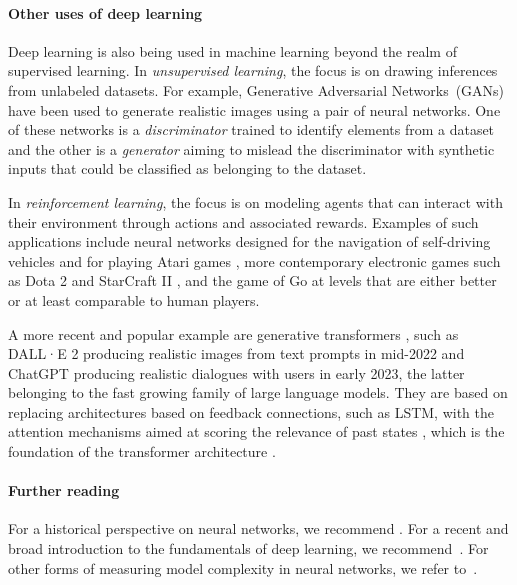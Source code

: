 \paragraph{Other uses of deep learning}
Deep learning is also being used in machine learning beyond the realm of  supervised learning. 
In \emph{unsupervised learning}, the focus is on drawing inferences from unlabeled datasets. 
For example, 
Generative Adversarial Networks~(GANs) \citep{GAN} have been used to generate realistic images using a pair of neural networks. 
One of these networks is a \emph{discriminator} trained to identify elements from a dataset and the other is a \emph{generator} aiming to mislead the discriminator with synthetic inputs that could be classified as belonging to the dataset. 

In \emph{reinforcement learning}, the focus is on modeling agents that can interact with their environment through actions and associated rewards. Examples of such applications include neural networks designed for the navigation of self-driving vehicles \citep{gao2020vectornet} and for playing Atari games \citep{Atari}, more contemporary electronic games such as Dota 2 \citep{dota2} and StarCraft II \citep{starcraft2}, and the game of Go \citep{AlphaGo} at levels that are either better or at least comparable to human players.  

A more recent and popular example are generative transformers \citep{GPT}, such as DALL·E 2 \citep{dalle2} producing realistic images from text prompts in mid-2022 
and ChatGPT \citep{ChatGPT} producing realistic dialogues with users in early 2023, 
the latter belonging to the fast growing family of large language models. 
They are based on replacing architectures based on feedback connections, such as LSTM, with the attention mechanisms aimed at scoring the relevance of past states \citep{bahdanau2015translation}, which is the foundation of the transformer architecture \citep{vaswani2017attention}.





\paragraph{Further reading}
For a historical perspective on neural networks, we recommend \cite{historical}. 
For a recent and broad introduction to the fundamentals of deep learning, we recommend~\cite{zhang2023dive}. 
For other forms of measuring model complexity in neural networks, we refer to~\cite{hu2021complexity}. 
